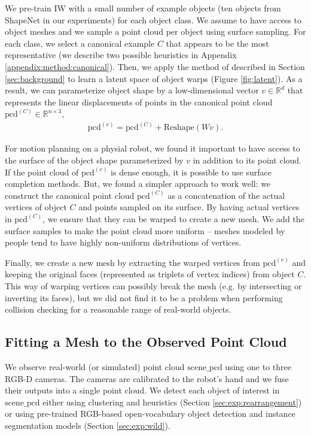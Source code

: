 \documentclass{article}
\newcommand{\pcx}[1]{\mathrm{pcd}^{(#1)}}
\newcommand{\pcc}{\pcx{C}}
\begin{document}
We pre-train IW with a small number of example objects (ten objects from ShapeNet \cite{chang15shapenet} in our experiments) for each object class. We assume to have access to object meshes and we sample a point cloud per object using surface sampling. For each class, we select a canonical example $C$ that appears to be the most representative (we describe two possible heuristics in Appendix \ref{appendix:method:canonical}). Then, we apply the method of \cite{rodriguez18transferring} described in Section \ref{sec:background} to learn a latent space of object warps (Figure \ref{fig:latent}). As a result, we can parameterize object shape by a low-dimensional vector $v \in \mathbb{R}^d$ that represents the linear displacements of points in the canonical point cloud $\pcc \in \mathbb{R}^{n \times 3}$,
\begin{align}
    \pcx{v} = \pcc + \mathrm{Reshape}(W v).
\end{align}

For motion planning on a physial robot, we found it important to have access to the surface of the object shape parameterized by $v$ in addition to its point cloud. If the point cloud of $\pcx{v}$ is dense enough, it is possible to use surface completion methods. But, we found a simpler approach to work well: we construct the canonical point cloud $\pcc$ as a concatenation of the actual vertices of object $C$ and points sampled on its surface. By having actual vertices in $\pcc$, we ensure that they can be warped to create a new mesh. We add the surface samples to make the point cloud more uniform -- meshes modeled by people tend to have highly non-uniform distributions of vertices.

Finally, we create a new mesh by extracting the warped vertices from $\pcx{v}$ and keeping the original faces (represented as triplets of vertex indices) from object $C$. This way of warping vertices can possibly break the mesh (e.g. by intersecting or inverting its faces), but we did not find it to be a problem when performing collision checking for a reasonable range of real-world objects.

\subsection{Fitting a Mesh to the Observed Point Cloud}
\label{sec:methods:scene}

We observe real-world (or simulated) point cloud $\mathrm{scene\_pcd}$ using one to three RGB-D cameras. The cameras are calibrated to the robot's hand and we fuse their outputs into a single point cloud. We detect each object of interest in $\mathrm{scene\_pcd}$ either using clustering and heuristics (Section \ref{sec:exp:rearrangement}) or using pre-trained RGB-based open-vocabulary object detection and instance segmentation models (Section \ref{sec:exp:wild}).
\end{document}
